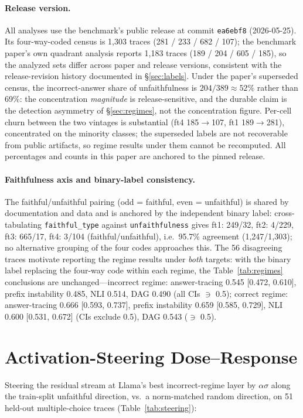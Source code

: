\documentclass{article}
\begin{document}
\paragraph{Release version.} All analyses use the benchmark's public release at commit \texttt{ea6ebf8} (2026-05-25). Its four-way-coded census is 1{,}303 traces (281 / 233 / 682 / 107); the benchmark paper's own quadrant analysis reports 1{,}183 traces (189 / 204 / 605 / 185), so the analyzed sets differ across paper and release versions, consistent with the release-revision history documented in \S\ref{sec:labels}. Under the paper's superseded census, the incorrect-answer share of unfaithfulness is $204/389 \approx 52\%$ rather than 69\%: the concentration \emph{magnitude} is release-sensitive, and the durable claim is the detection asymmetry of \S\ref{sec:regimes}, not the concentration figure. Per-cell churn between the two vintages is substantial (ft4 185$\to$107, ft1 189$\to$281), concentrated on the minority classes; the superseded labels are not recoverable from public artifacts, so regime results under them cannot be recomputed. All percentages and counts in this paper are anchored to the pinned release.

\paragraph{Faithfulness axis and binary-label consistency.} The faithful/unfaithful pairing (odd = faithful, even = unfaithful) is shared by documentation and data and is anchored by the independent binary label: cross-tabulating \texttt{faithful\_type} against \texttt{unfaithfulness} gives ft1: 249/32, ft2: 4/229, ft3: 665/17, ft4: 3/104 (faithful/unfaithful), i.e.\ 95.7\% agreement (1{,}247/1{,}303); no alternative grouping of the four codes approaches this. The 56 disagreeing traces motivate reporting the regime results under \emph{both} targets: with the binary label replacing the four-way code within each regime, the Table~\ref{tab:regimes} conclusions are unchanged---incorrect regime: answer-tracing 0.545 [0.472, 0.610], prefix instability 0.485, NLI 0.514, DAG 0.490 (all CIs $\ni$ 0.5); correct regime: answer-tracing 0.666 [0.593, 0.737], prefix instability 0.659 [0.585, 0.729], NLI 0.600 [0.531, 0.672] (CIs exclude 0.5), DAG 0.543 ($\ni$ 0.5).

\section{Activation-Steering Dose--Response}
\label{app:steering}
Steering the residual stream at Llama's best incorrect-regime layer by $\alpha\sigma$ along the train-split unfaithful direction, vs.\ a norm-matched random direction, on 51 held-out multiple-choice traces (Table~\ref{tab:steering}):
\end{document}
